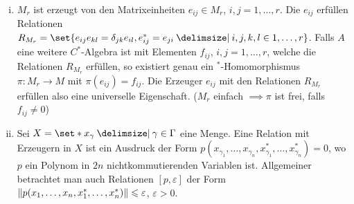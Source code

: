 \begin{beispiel}
	\leavevmode
	\begin{enumerate}[(i)]
		\item $M_r$ ist erzeugt von den Matrixeinheiten $e_{ij} \in M_r$, $i,j=1,\ldots ,r$.
		Die $e_{ij}$ erfüllen Relationen $R_{M_r}=\set{e_{ij} e_{kl}=\delta_{jk} e_{il}, e_{ij}^*= e_{ji} \given  i,j,k,l \in 1,\ldots ,r}$.
		Falls $A$ eine weitere $C^*$-Algebra ist mit Elementen  $f_{ij}$, $i,j=1,\ldots,r$, welche die Relationen $R_{M_r}$ erfüllen, so existiert genau ein $^*$-Homomorphismus $\pi \colon M_r \to M$ mit $\pi(e_{ij})=f_{ij}$.
		Die Erzeuger $e_{ij}$ mit den Relationen $R_{M_r}$ erfüllen also eine universelle Eigenschaft.
		($M_r$ einfach $\implies \pi$ ist frei, falls $f_{ij}\neq 0$)
		\item Sei $X=\set*{x_\gamma \given \gamma \in \Gamma}$ eine Menge.
		Eine Relation mit Erzeugern in $X$ ist ein Ausdruck der Form $p(x_{\gamma_1}, \ldots ,x_{\gamma_n}, x_{\gamma_1}^*, \ldots , x_{\gamma_n}^*)=0$, wo $p$ ein Polynom in $2n$ nichtkommutierenden Variablen ist.
		Allgemeiner betrachtet man auch Relationen $[p,\varepsilon]$ der Form $\norm*{p(x_1,\ldots ,x_n,x_1^*,\ldots ,x_n^*)} \le \varepsilon$, $\varepsilon>0$.
		

\end{enumerate}
\end{beispiel}
